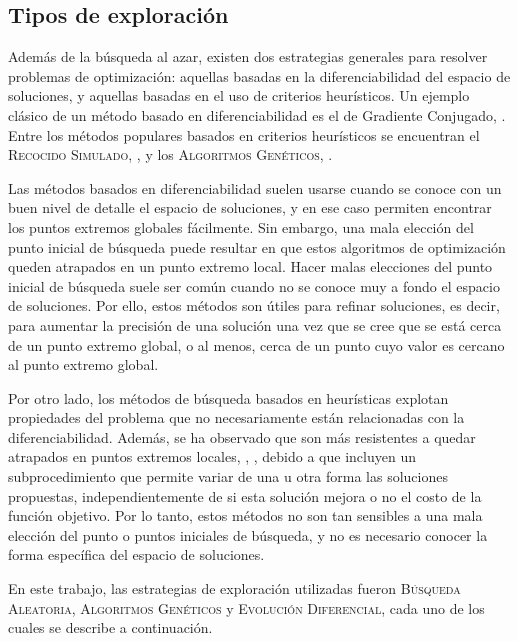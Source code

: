 \subsection{Tipos de exploración}

Además de la búsqueda al azar, existen dos estrategias generales para resolver problemas de optimización: aquellas basadas en la diferenciabilidad del espacio de soluciones, y aquellas basadas en el uso de criterios heurísticos.
Un ejemplo clásico de un método basado en diferenciabilidad es el de Gradiente Conjugado, \citeauthor{numrecipesc} \citep{numrecipesc}. Entre los métodos populares basados en criterios heurísticos se encuentran el \textsc{Recocido Simulado}, \citeauthor{Kirkpatrick1983} \citep{Kirkpatrick1983}, y los \textsc{Algoritmos Genéticos}, \citeauthor{Goldberg1989} \citep{Goldberg1989}.

Las métodos basados en diferenciabilidad suelen usarse cuando se conoce con un buen nivel de detalle el espacio de soluciones, y en ese caso permiten encontrar los puntos extremos globales fácilmente. Sin embargo, una mala elección del punto inicial de búsqueda puede resultar en que estos algoritmos de optimización queden atrapados en un punto extremo local. Hacer malas elecciones del punto inicial de búsqueda suele ser común cuando no se conoce muy a fondo el espacio de soluciones. Por ello, estos métodos son útiles para refinar soluciones, es decir, para aumentar la precisión de una solución una vez que se cree que se está cerca de un punto extremo global, o al menos, cerca de un punto cuyo valor es cercano al punto extremo global.

Por otro lado, los métodos de búsqueda basados en heurísticas explotan propiedades del problema que no necesariamente están relacionadas con la diferenciabilidad. Además, se ha observado que son más resistentes a quedar atrapados en puntos extremos locales, \citeauthor{BangaMoles2003} \citep{BangaMoles2003}, \citeauthor{Storn1997} \citep{Storn1997}, debido a que incluyen un subprocedimiento que permite variar de una u otra forma las soluciones propuestas, independientemente de si esta solución mejora o no el costo de la función objetivo. Por lo tanto, estos métodos no son tan sensibles a una mala elección del punto o puntos iniciales de búsqueda, y no es necesario conocer la forma específica del espacio de soluciones.

En este trabajo, las estrategias de exploración utilizadas fueron \textsc{Búsqueda Aleatoria}, \textsc{Algoritmos Genéticos} y \textsc{Evolución Diferencial}, cada uno de los cuales se describe a continuación.

